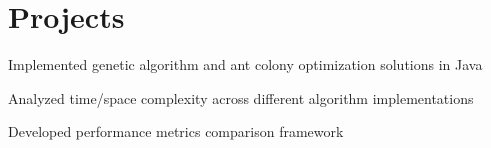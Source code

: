 \documentclass[]{deedy-resume-reversed}
\begin{document}
\begin{minipage}[t]{0.60\textwidth}
\sectionsep




\section{Projects}
\begin{tightemize}
\item Implemented genetic algorithm and ant colony optimization solutions in Java
\item Analyzed time/space complexity across different algorithm implementations
\item Developed performance metrics comparison framework
\end{tightemize}
\sectionsep


\end{minipage}
\end{document}

